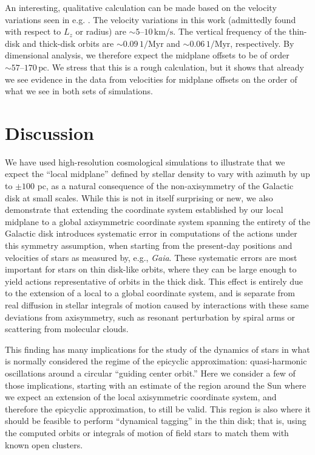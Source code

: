 \documentclass[twocolumn]{aastex62}
\newcommand{\pc}{\text{pc}}
\newcommand{\Myr}{\text{Myr}}
\newcommand{\kms}{\text{km}/\text{s}}
\begin{document}
An interesting, qualitative calculation can be made based on the velocity
variations seen in e.g. \citet{2019arXiv190209569F}. The velocity variations
in this work (admittedly found with respect to $L_z$ or radius) are
$\sim5\text{--}10\,\kms$. The vertical frequency of the thin-disk and
thick-disk orbits are $\sim 0.09\,1/\Myr$ and $\sim0.06\,1/\Myr$,
respectively. By dimensional analysis, we therefore expect the midplane
offsets to be of order $\sim 57\text{--}170\,\pc$. We stress that this is a
rough calculation, but it shows that already we see evidence in the data from
velocities for midplane offsets on the order of what we see in both sets of
simulations.

\section{Discussion} \label{sec:discussion}
We have used high-resolution cosmological simulations to illustrate that we
expect the ``local midplane'' defined by stellar density to vary with azimuth
by up to $\pm 100$ pc, as a natural consequence of the non-axisymmetry of the
Galactic disk at small scales. While this is not in itself surprising or new,
we also demonstrate that extending the coordinate system established by our
local midplane to a global axisymmetric coordinate system spanning the
entirety of the Galactic disk introduces systematic error in computations of
the actions under this symmetry assumption, when starting from the present-day
positions and velocities of stars as measured by, e.g., \emph{Gaia}. These
systematic errors are most important for stars on thin disk-like orbits, where
they can be large enough to yield actions representative of orbits in the
thick disk. This effect is entirely due to the extension of a local to a
global coordinate system, and is separate from real diffusion in stellar
integrals of motion caused by interactions with these same deviations from
axisymmetry, such as resonant perturbation by spiral arms or scattering from
molecular clouds.

This finding has many implications for the study of the dynamics of stars in
what is normally considered the regime of the epicyclic approximation:
quasi-harmonic oscillations around a circular ``guiding center orbit.'' Here
we consider a few of those implications, starting with an estimate of the
region around the Sun where we expect an extension of the local axisymmetric
coordinate system, and therefore the epicyclic approximation, to still be
valid. This region is also where it should be feasible to perform ``dynamical
tagging'' in the thin disk; that is, using the computed orbits or integrals of
motion of field stars to match them with known open clusters.
\end{document}
